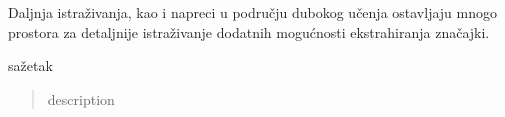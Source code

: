 \documentclass[times, utf8, proizvoljni, numeric]{fer}
\begin{document}
Daljnja istraživanja, kao i napreci u području dubokog učenja ostavljaju mnogo prostora za detaljnije istraživanje dodatnih mogućnosti ekstrahiranja značajki.

\begin{sazetak}
	sažetak
	
\end{sazetak}

\begin{abstract}
	description
	
\end{abstract}



\pagebreak
\end{document}
